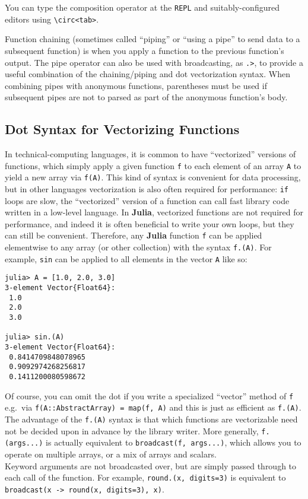 \documentclass[
]{article}
\begin{document}
You can type the composition operator at the \texttt{REPL} and
suitably-configured editors using
\texttt{\textbackslash{}circ\textless{}tab\textgreater{}}.

Function chaining (sometimes called ``piping'' or ``using a pipe'' to
send data to a subsequent function) is when you apply a function to the
previous function's output. The pipe operator can also be used with
broadcasting, as \texttt{.\textbar{}\textgreater{}}, to provide a useful
combination of the chaining/piping and dot vectorization syntax. When
combining pipes with anonymous functions, parentheses must be used if
subsequent pipes are not to parsed as part of the anonymous function's
body.

\hypertarget{dot-syntax-for-vectorizing-functions}{%
\subsection{Dot Syntax for Vectorizing
Functions}\label{dot-syntax-for-vectorizing-functions}}

In technical-computing languages, it is common to have ``vectorized''
versions of functions, which simply apply a given function \texttt{f} to
each element of an array \texttt{A} to yield a new array via
\texttt{f(A)}. This kind of syntax is convenient for data processing,
but in other languages vectorization is also often required for
performance: \texttt{if} loops are slow, the ``vectorized'' version of a
function can call fast library code written in a low-level language. In
\textbf{Julia}, vectorized functions are not required for performance,
and indeed it is often beneficial to write your own loops, but they can
still be convenient. Therefore, any \textbf{Julia} function \texttt{f}
can be applied elementwise to any array (or other collection) with the
syntax \texttt{f.(A)}. For example, \texttt{sin} can be applied to all
elements in the vector \texttt{A} like so:

\begin{verbatim}
julia> A = [1.0, 2.0, 3.0]
3-element Vector{Float64}:
 1.0
 2.0
 3.0

julia> sin.(A)
3-element Vector{Float64}:
 0.8414709848078965
 0.9092974268256817
 0.1411200080598672
\end{verbatim}

Of course, you can omit the dot if you write a specialized ``vector''
method of \texttt{f} e.g.~via
\texttt{f(A::AbstractArray)\ =\ map(f,\ A)} and this is just as
efficient as \texttt{f.(A)}. The advantage of the \texttt{f.(A)} syntax
is that which functions are vectorizable need not be decided upon in
advance by the library writer. More generally, \texttt{f.(args...)} is
actually equivalent to \texttt{broadcast(f,\ args...)}, which allows you
to operate on multiple arrays, or a mix of arrays and scalars.\\
Keyword arguments are not broadcasted over, but are simply passed
through to each call of the function. For example,
\texttt{round.(x,\ digits=3)} is equivalent to
\texttt{broadcast(x\ -\textgreater{}\ round(x,\ digits=3),\ x)}.
\end{document}
